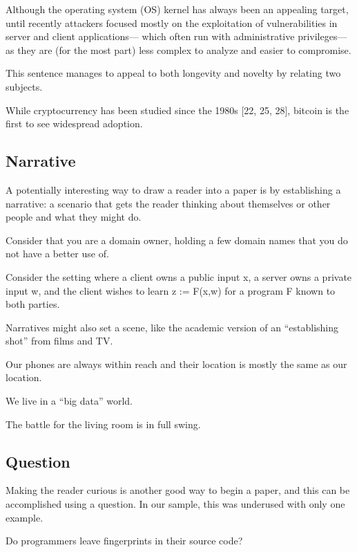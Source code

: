 \documentclass[sigconf]{acmart}
\begin{document}
	Although the operating system (OS) kernel has always been an appealing target, until recently attackers focused mostly on the exploitation of vulnerabilities in server and client applications— which often run with administrative privileges—as they are (for the most part) less complex to analyze and easier to compromise.
	
	This sentence manages to appeal to both longevity and novelty by relating two subjects.
	
	While cryptocurrency has been studied since the 1980s [22, 25, 28], bitcoin is the first to see widespread adoption.
	
\subsection{Narrative}
	
	A potentially interesting way to draw a reader into a paper is by establishing a narrative: a scenario that gets the reader thinking about themselves or other people and what they might do.  
	
	Consider that you are a domain owner, holding a few domain names that you do not have a better use of.
	
	Consider the setting where a client owns a public input x, a server owns a private input w, and the client wishes to learn z := F(x,w) for a program F known to both parties.
	
	Narratives might also set a scene, like the academic version of an “establishing shot” from films and TV. 
	
	Our phones are always within reach and their location is mostly the same as our location.
	
	We live in a “big data” world.
	
	The battle for the living room is in full swing.
	
\subsection{Question} 
	
	Making the reader curious is another good way to begin a paper, and this can be accomplished using a question. In our sample, this was underused with only one example.
	
	Do programmers leave fingerprints in their source code?
	
	
\end{document}
